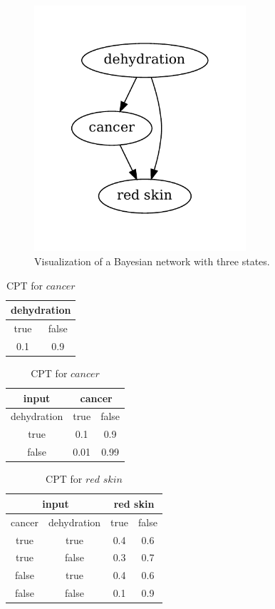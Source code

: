 \documentclass[thesis=B,english]{FITthesis}[2012/06/26]
\begin{document}
\begin{figure}
	\centering
 	\includegraphics[width=0.7\textwidth]{bn}
 	\caption{Visualization of a Bayesian network with three states.}
 	\label{fig:bn}
\end{figure}

\begin{table}
\parbox{0.45\linewidth}{
\centering
\begin{tabular}{|c|c|}
\hline
\multicolumn{2}{|c|}{dehydration}  \\
\hline
true & false \\
\hline
0.1 & 0.9 \\
\hline
\end{tabular}
\caption{CPT for $dehydration$}
}
\hfill
\parbox{0.45\linewidth}{
\centering
\begin{tabular}{|c||c|c|}
\hline
input & \multicolumn{2}{c|}{cancer} \\
\hline
dehydration & true & false \\
\hline
true & 0.1 & 0.9 \\
\hline
false & 0.01 & 0.99 \\
\hline
\end{tabular}
\caption{CPT for $cancer$}
}
\end{table}

\begin{table}
\centering
\begin{tabular}{|c|c||c|c|}
\hline
\multicolumn{2}{|c||}{input} & \multicolumn{2}{c|}{red skin} \\
\hline
cancer & dehydration & true & false \\
\hline
true & true & 0.4 & 0.6 \\
\hline
true & false & 0.3 & 0.7 \\
\hline
false & true & 0.4 & 0.6 \\
\hline
false & false & 0.1 & 0.9 \\
\hline
\end{tabular}
\caption{CPT for $red$ $skin$}
\end{table}
\end{document}
